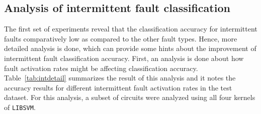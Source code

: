 \subsection{Analysis of intermittent fault classification}
\label{sec:wp:intanalysis}
The first set of experiments reveal that the classification accuracy for intermittent faults comparatively low as compared to the other fault types. Hence, more detailed analysis is done, which can provide some hints about the improvement of intermittent fault classification accuracy. First, an analysis is done about how fault activation rates might be affecting classification accuracy. Table~\ref{tab:intdetail} summarizes the result of this analysis and it notes the accuracy results for different intermittent fault activation rates in the test dataset. For this analysis, a subset of circuits were analyzed using all four kernels of \texttt{LIBSVM}.

